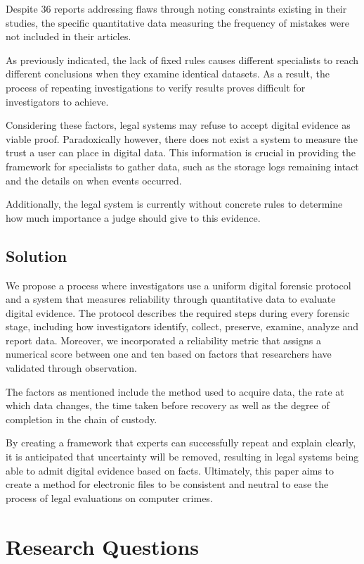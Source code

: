 \documentclass[a4paper]{report}
\begin{document}
\begin{justify}
Despite 36 reports addressing flaws through noting constraints existing in their studies, the specific quantitative data measuring the frequency of mistakes were not included in their articles. 

As previously indicated, the lack of fixed rules causes different specialists to reach different conclusions when they examine identical datasets. As a result, the process of repeating investigations to verify results proves difficult for investigators to achieve. 

Considering these factors, legal systems may refuse to accept digital evidence as viable proof. Paradoxically however, there does not exist a system to measure the trust a user can place in digital data. This information is crucial in providing the framework for specialists to gather data, such as the storage logs remaining intact and the details on when events occurred. 

Additionally, the legal system is currently without concrete rules to determine how much importance a judge should give to this evidence.

\section{Solution}
We propose a process where investigators use a uniform digital forensic protocol and a system that measures reliability through quantitative data to evaluate digital evidence. The protocol describes the required steps during every forensic stage, including how investigators identify, collect, preserve, examine, analyze and report data. Moreover, we incorporated a reliability metric that assigns a numerical score between one and ten based on factors that researchers have validated through observation.

The factors as mentioned include the method used to acquire data, the rate at which data changes, the time taken before recovery as well as the degree of completion in the chain of custody. 

By creating a framework that experts can successfully repeat and explain clearly, it is anticipated that uncertainty will be removed, resulting in legal systems being able to admit digital evidence based on facts. Ultimately, this paper aims to create a method for electronic files to be consistent and neutral to ease the process of legal evaluations on computer crimes. 

\chapter{Research Questions}


\end{justify}
\end{document}
